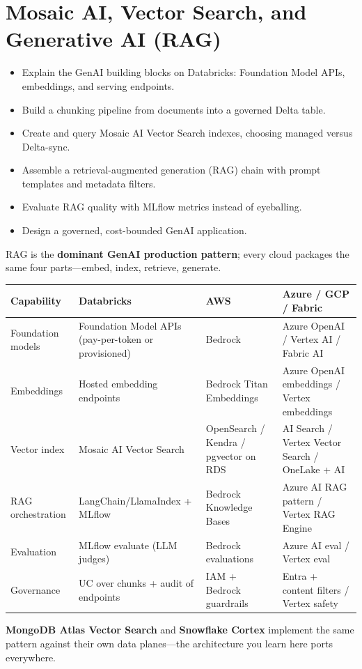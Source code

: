\chapter{Mosaic AI, Vector Search, and Generative AI (RAG)}
%
%
\begin{objectives}
\begin{itemize}
    \item Explain the GenAI building blocks on Databricks: Foundation Model APIs, embeddings, and serving endpoints.
    \item Build a chunking pipeline from documents into a governed Delta table.
    \item Create and query Mosaic AI Vector Search indexes, choosing managed versus Delta-sync.
    \item Assemble a retrieval-augmented generation (RAG) chain with prompt templates and metadata filters.
    \item Evaluate RAG quality with MLflow metrics instead of eyeballing.
    \item Design a governed, cost-bounded GenAI application.
\end{itemize}
\end{objectives}

\begin{crosscloud}
RAG is the \textbf{dominant GenAI production pattern}; every cloud packages the same four
parts---embed, index, retrieve, generate.

\vspace{2mm}
{\footnotesize
\begin{tabular}{@{}p{3.0cm}p{3.4cm}p{3.2cm}p{3.2cm}@{}}
\toprule
\textbf{Capability} & \textbf{Databricks} & \textbf{AWS} & \textbf{Azure / GCP / Fabric} \\
\midrule
Foundation models & Foundation Model APIs (pay-per-token or provisioned) & Bedrock & Azure OpenAI / Vertex AI / Fabric AI \\
Embeddings & Hosted embedding endpoints & Bedrock Titan Embeddings & Azure OpenAI embeddings / Vertex embeddings \\
Vector index & Mosaic AI Vector Search & OpenSearch / Kendra / pgvector on RDS & AI Search / Vertex Vector Search / OneLake + AI \\
RAG orchestration & LangChain/LlamaIndex + MLflow & Bedrock Knowledge Bases & Azure AI RAG pattern / Vertex RAG Engine \\
Evaluation & MLflow evaluate (LLM judges) & Bedrock evaluations & Azure AI eval / Vertex eval \\
Governance & UC over chunks + audit of endpoints & IAM + Bedrock guardrails & Entra + content filters / Vertex safety \\
\bottomrule
\end{tabular}}

\vspace{1mm}
\textbf{MongoDB Atlas Vector Search} and \textbf{Snowflake Cortex} implement the same pattern
against their own data planes---the architecture you learn here ports everywhere.
\end{crosscloud}

